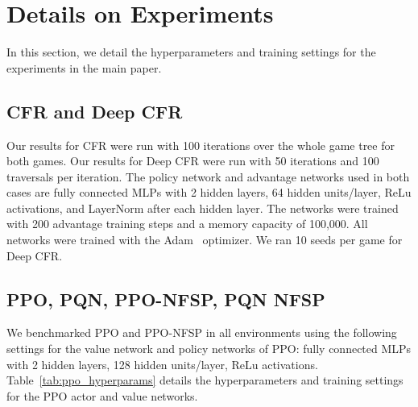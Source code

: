 \section{Details on Experiments}\label{supp:baselines}
In this section, we detail the hyperparameters and training settings for the experiments in the main paper.

\subsection{CFR and Deep CFR}
Our results for CFR were run with 100 iterations over the whole game tree for both games. Our results for Deep CFR were run with 50 iterations and 100 traversals per iteration. The policy network and advantage networks used in both cases are fully connected MLPs with 2 hidden layers, 64 hidden units/layer, ReLu activations, and LayerNorm after each hidden layer. The networks were trained with 200 advantage training steps and a memory capacity of 100,000. All networks were trained with the Adam~\citep{kingma2014adam} optimizer. We ran 10 seeds per game for Deep CFR.

\subsection{PPO, PQN, PPO-NFSP, PQN NFSP}
We benchmarked PPO and PPO-NFSP in all environments using the following settings for the value network and policy networks of PPO: fully connected MLPs with 2 hidden layers, 128 hidden units/layer, ReLu activations. Table~\ref{tab:ppo_hyperparams} details the hyperparameters and training settings for the PPO actor and value networks.

